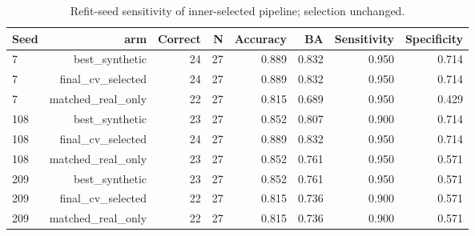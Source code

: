 \begin{table}[t]
\centering
\caption{Refit-seed sensitivity of inner-selected pipeline; selection unchanged.}
\footnotesize
\begin{tabular}{lrrrrrrr}
\toprule
Seed & arm & Correct & N & Accuracy & BA & Sensitivity & Specificity \\
\midrule
7 & best\_synthetic & 24 & 27 & 0.889 & 0.832 & 0.950 & 0.714 \\
7 & final\_cv\_selected & 24 & 27 & 0.889 & 0.832 & 0.950 & 0.714 \\
7 & matched\_real\_only & 22 & 27 & 0.815 & 0.689 & 0.950 & 0.429 \\
108 & best\_synthetic & 23 & 27 & 0.852 & 0.807 & 0.900 & 0.714 \\
108 & final\_cv\_selected & 24 & 27 & 0.889 & 0.832 & 0.950 & 0.714 \\
108 & matched\_real\_only & 23 & 27 & 0.852 & 0.761 & 0.950 & 0.571 \\
209 & best\_synthetic & 23 & 27 & 0.852 & 0.761 & 0.950 & 0.571 \\
209 & final\_cv\_selected & 22 & 27 & 0.815 & 0.736 & 0.900 & 0.571 \\
209 & matched\_real\_only & 22 & 27 & 0.815 & 0.736 & 0.900 & 0.571 \\
\bottomrule
\end{tabular}
\end{table}
